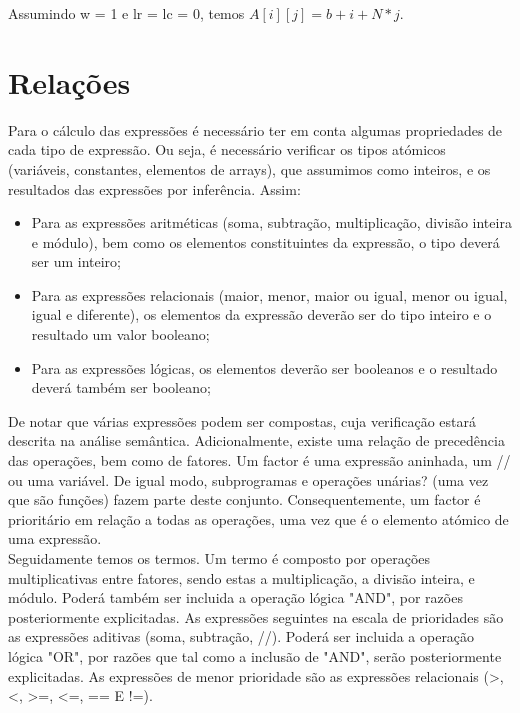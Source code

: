 Assumindo w = 1 e lr = lc = 0, temos $A[i][j] = b + i + N * j$.\\

\section{Relações}
\label{sec:relacoes:analise}

Para o cálculo das expressões é necessário ter em conta algumas propriedades de
cada tipo de expressão. Ou seja, é necessário verificar os tipos atómicos
(variáveis, constantes, elementos de arrays), que assumimos como inteiros, e os
resultados das expressões por inferência. Assim:\\
\begin{itemize}
\item Para as expressões aritméticas (soma, subtração, multiplicação, divisão
	inteira e módulo), bem como os elementos constituintes da expressão, o tipo
	deverá ser um inteiro;
\item Para as expressões relacionais (maior, menor, maior ou igual, menor ou
	igual, igual e diferente), os elementos da expressão deverão ser do tipo
	inteiro e o resultado um valor booleano;
\item Para as expressões lógicas, os elementos deverão ser booleanos
	e o resultado deverá também ser booleano;
\end{itemize}

De notar que várias expressões podem ser compostas, cuja verificação estará
descrita na análise semântica. Adicionalmente, existe uma relação de precedência
das operações, bem como de fatores. Um factor é uma expressão aninhada, um // ou
uma variável. De igual modo, subprogramas e operações unárias? (uma vez que são
funções) fazem parte deste conjunto. Consequentemente, um factor é prioritário
em relação a todas as operações, uma vez que é o elemento atómico de uma
expressão.\\

Seguidamente temos os termos. Um termo é composto por operações multiplicativas
entre fatores, sendo estas a multiplicação, a divisão inteira, e módulo. Poderá
também ser incluida a operação lógica "AND", por razões posteriormente
explicitadas. As expressões seguintes na escala de prioridades são as expressões
aditivas (soma, subtração, //). Poderá ser incluida a operação lógica "OR", por
razões que tal como a inclusão de "AND", serão posteriormente explicitadas. As
expressões de menor prioridade são as expressões relacionais (>, <, >=, <=, ==
E !=).\\

